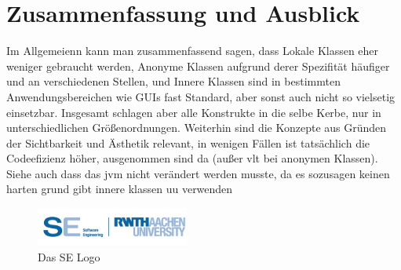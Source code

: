 \chapter{Zusammenfassung und Ausblick}

Im Allgemeienn kann man zusammenfassend sagen, dass Lokale Klassen eher weniger gebraucht werden, Anonyme Klassen aufgrund derer Spezifität häufiger und an verschiedenen Stellen, und Innere Klassen sind in bestimmten Anwendungsbereichen wie GUIs fast Standard, aber sonst auch nicht so vielsetig einsetzbar.
Insgesamt schlagen aber alle Konstrukte in die selbe Kerbe, nur in unterschiedlichen Größenordnungen.
Weiterhin sind die Konzepte aus Gründen der Sichtbarkeit und Ästhetik relevant, in wenigen Fällen ist tatsächlich die Codeefizienz höher, ausgenommen sind da (außer vlt bei anonymen Klassen). Siehe auch dass das jvm nicht verändert werden musste, da es sozusagen keinen harten grund gibt innere klassen uu verwenden

\begin{figure}[ht!]
\begin{center}\includegraphics[width=5cm]{src/pic/logo}\end{center}
\caption{Das SE Logo}
\label{Logo}
\end{figure}

\newpage

